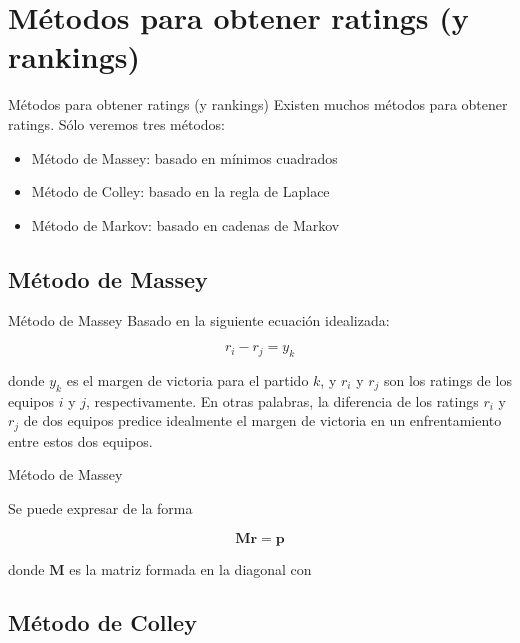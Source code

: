 \documentclass[11pt]{beamer}
\begin{document}
	\section{Métodos para obtener ratings (y rankings)}
	
	\begin{frame}{Métodos para obtener ratings (y rankings)}
		Existen muchos métodos para obtener ratings. Sólo veremos tres métodos:
		
		\begin{itemize}
			\item Método de Massey: basado en mínimos cuadrados
			\item Método de Colley: basado en la regla de Laplace
			\item Método de Markov: basado en cadenas de Markov
		\end{itemize}
	\end{frame}
	
	\subsection{Método de Massey}
	
	\begin{frame}{Método de Massey}
		Basado en la siguiente ecuación idealizada:
		
		\begin{equation}
		r_i - r_j = y_k
		\end{equation} 
		
		donde $y_k$ es el margen de victoria para el partido $k$, y $r_i$ y $r_j$ son los ratings de los equipos $i$ y $j$, respectivamente. En otras palabras, la diferencia de los ratings $r_i$ y $r_j$ de dos equipos predice idealmente el margen de victoria en un enfrentamiento entre estos dos equipos.
	
	\end{frame}
	
	\begin{frame}{Método de Massey}
	
		Se puede expresar de la forma 
		
		\[ \mathbf{M r} = \mathbf{p} \]
		
		donde $\mathbf{M}$ es la matriz formada en la diagonal con 
		
	\end{frame}
	
	\subsection{Método de Colley}
	
\end{document}

